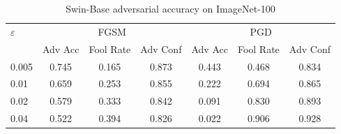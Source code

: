 \begin{table}[h]
\centering
\caption{Swin-Base adversarial accuracy on ImageNet-100}
\begin{tabular}{lcccccc}
\toprule
$\varepsilon$ & \multicolumn{3}{c}{FGSM} & \multicolumn{3}{c}{PGD} \\
& Adv Acc & Fool Rate & Adv Conf & Adv Acc & Fool Rate & Adv Conf \\
\midrule
0.005 & 0.745 & 0.165 & 0.873 & 0.443 & 0.468 & 0.834 \\
0.01 & 0.659 & 0.253 & 0.855 & 0.222 & 0.694 & 0.865 \\
0.02 & 0.579 & 0.333 & 0.842 & 0.091 & 0.830 & 0.893 \\
0.04 & 0.522 & 0.394 & 0.826 & 0.022 & 0.906 & 0.928 \\
\bottomrule
\end{tabular}
\end{table}